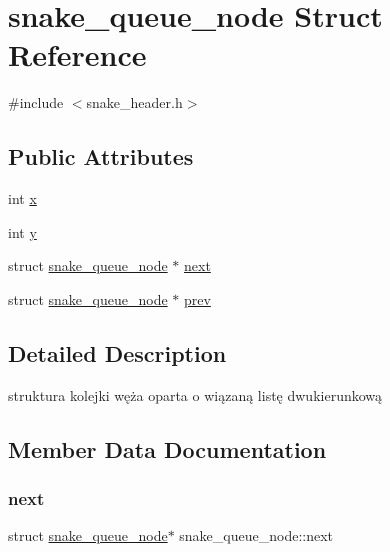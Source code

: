 \hypertarget{structsnake__queue__node}{}\section{snake\+\_\+queue\+\_\+node Struct Reference}
\label{structsnake__queue__node}


{\ttfamily \#include $<$snake\+\_\+header.\+h$>$}

\subsection*{Public Attributes}
\begin{DoxyCompactItemize}
\item 
int \mbox{\hyperlink{structsnake__queue__node_a1efd876ed3160690812ada8ebb8a966b}{x}}
\item 
int \mbox{\hyperlink{structsnake__queue__node_a33fca17abd7a835bd1f302706192bf03}{y}}
\item 
struct \mbox{\hyperlink{structsnake__queue__node}{snake\+\_\+queue\+\_\+node}} $\ast$ \mbox{\hyperlink{structsnake__queue__node_a10dbc28907a5f4bca9ebcad1bc94330a}{next}}
\item 
struct \mbox{\hyperlink{structsnake__queue__node}{snake\+\_\+queue\+\_\+node}} $\ast$ \mbox{\hyperlink{structsnake__queue__node_a4d5771c990e125457af48d355a33d524}{prev}}
\end{DoxyCompactItemize}


\subsection{Detailed Description}
struktura kolejki węża oparta o wiązaną listę dwukierunkową 

\subsection{Member Data Documentation}
\mbox{\label{structsnake__queue__node_a10dbc28907a5f4bca9ebcad1bc94330a}} 
\subsubsection{\texorpdfstring{next}{next}}
{\footnotesize\ttfamily struct \mbox{\hyperlink{structsnake__queue__node}{snake\+\_\+queue\+\_\+node}}$\ast$ snake\+\_\+queue\+\_\+node\+::next}

